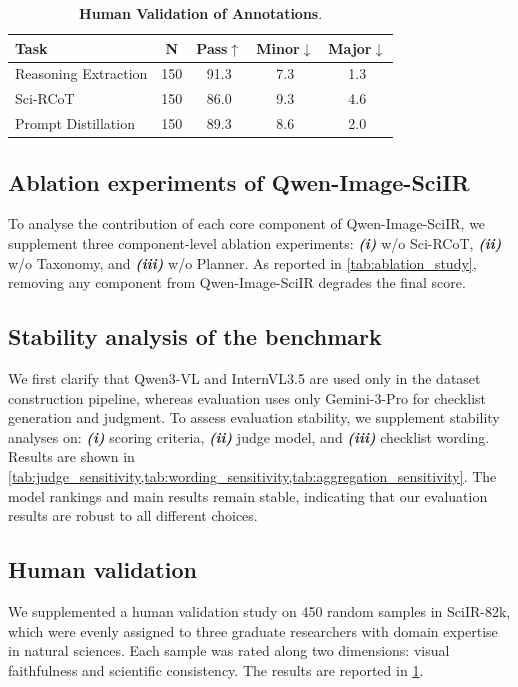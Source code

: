 \documentclass[runningheads]{llncs}
\begin{document}
\begin{table}[t]
\centering
\caption{\textbf{Human Validation of Annotations}.}
\label{tab:human_audit}

\small
\setlength{\tabcolsep}{6pt}
\renewcommand{\arraystretch}{1.15}

\begin{tabular}{lcccc}
\toprule
\textbf{Task}
&
\textbf{N}
&
\textbf{Pass$\uparrow$}
&
\textbf{Minor$\downarrow$}
&
\textbf{Major$\downarrow$}
\\
\midrule
Reasoning Extraction
& 150
& 91.3
& 7.3
& 1.3 \\

Sci-RCoT
& 150
& 86.0
& 9.3
& 4.6 \\

Prompt Distillation
& 150
& 89.3
& 8.6
& 2.0 \\
\bottomrule
\end{tabular}
\end{table}

\subsection{Ablation experiments of Qwen-Image-SciIR}
To analyse the contribution of each core component of Qwen-Image-SciIR, we supplement three component-level ablation experiments: \textbf{\textit{(i)}} w/o Sci-RCoT, \textbf{\textit{(ii)}} w/o Taxonomy, and \textbf{\textit{(iii)}} w/o Planner. As reported in \cref{tab:ablation_study}, removing any component from Qwen-Image-SciIR degrades the final score.

\subsection{Stability analysis of the benchmark}
We first clarify that Qwen3-VL and InternVL3.5 are used only in the dataset construction pipeline, whereas evaluation uses only Gemini-3-Pro for checklist generation and judgment. To assess evaluation stability, we supplement stability analyses on:
\textbf{\textit{(i)}} scoring criteria,
\textbf{\textit{(ii)}} judge model,
and \textbf{\textit{(iii)}} checklist wording.
Results are shown in \cref{tab:judge_sensitivity,tab:wording_sensitivity,tab:aggregation_sensitivity}. The model rankings and main results remain stable, indicating that our evaluation results are robust to all different choices.

\subsection{Human validation}
We supplemented a human validation study on 450 random samples in SciIR-82k, which were evenly assigned to three graduate researchers with domain expertise in natural sciences. Each sample was rated along two dimensions: visual faithfulness and scientific consistency. The results are reported in \cref{tab:human_audit}.
\end{document}
